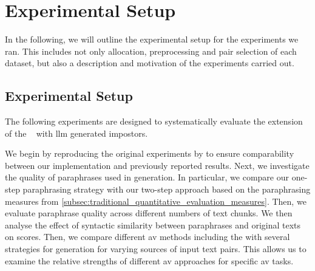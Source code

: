 \chapter{Experimental Setup}
\label{chap:experimental_setup}

In the following, we will outline the experimental setup for the experiments we ran.
This includes not only allocation, preprocessing and pair selection of each dataset, but also a description and motivation of the experiments carried out.






\section{Experimental Setup}
\label{sec:experimental_setup}

The following experiments are designed to systematically evaluate the extension of the \impAppr{}~\citep{koppel_determining_2014} with \ac{llm} generated impostors. 

We begin by reproducing the original experiments by \citet{koppel_determining_2014} to ensure comparability between our implementation and previously reported results. 
Next, we investigate the quality of paraphrases used in \imp{} generation. 
In particular, we compare our one-step paraphrasing strategy with our two-step approach based on the paraphrasing measures from \autoref{subsec:traditional_quantitative_evaluation_measures}. 
Then, we evaluate paraphrase quality across different numbers of text chunks.
We then analyse the effect of syntactic similarity between paraphrases and original texts on \imp{} scores. 
Then, we compare different \ac{av} methods including the \impAppr{} with several strategies for \imp{} generation for varying sources of input text pairs. 
This allows us to examine the relative strengths of different \ac{av} approaches for specific \ac{av} tasks.


















